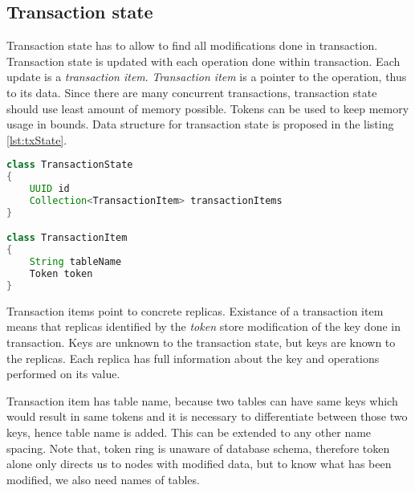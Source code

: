 \subsection{Transaction state}
Transaction state has to allow to find all modifications done in transaction. Transaction state is updated with each operation done within transaction. Each update is a \emph{transaction item}. \emph{Transaction item} is a pointer to the operation, thus to its data. Since there are many concurrent transactions, transaction state should use least amount of memory possible. Tokens can be used to keep memory usage in bounds. Data structure for transaction state is proposed in the listing \ref{lst:txState}.

\begin{lstlisting}[language=Java,style=outcode,label={lst:txState},caption={Transaction State data structure}]
class TransactionState
{
    UUID id
    Collection<TransactionItem> transactionItems    
}

class TransactionItem
{
    String tableName
    Token token
}
\end{lstlisting}






Transaction items point to concrete replicas. Existance of a transaction item means that replicas identified by the \emph{token} store modification of the key done in transaction. Keys are unknown to the transaction state, but keys are known to the replicas. Each replica has full information about the key and operations performed on its value. 

Transaction item has table name, because two tables can have same keys which would result in same tokens and it is necessary to differentiate between those two keys, hence table name is added. This can be extended to any other name spacing. Note that, token ring is unaware of database schema, therefore token alone only directs us to nodes with modified data, but to know what has been modified, we also need names of tables.

